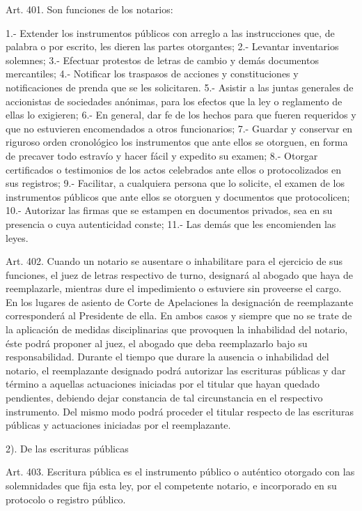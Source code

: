     Art. 401. Son funciones de los notarios:

    1.- Extender los instrumentos públicos con arreglo a las instrucciones que, de palabra o por escrito, les dieren las partes otorgantes;
    2.- Levantar inventarios solemnes;
    3.- Efectuar protestos de letras de cambio y demás documentos mercantiles;
    4.- Notificar los traspasos de acciones y constituciones y notificaciones de prenda que se les solicitaren.
    5.- Asistir a las juntas generales de accionistas de sociedades anónimas, para los efectos que la ley o reglamento de ellas lo exigieren;
    6.- En general, dar fe de los hechos para que fueren requeridos y que no estuvieren encomendados a otros funcionarios;
    7.- Guardar y conservar en riguroso orden cronológico los instrumentos que ante ellos se otorguen, en forma de precaver todo estravío y hacer fácil y expedito su examen;
    8.- Otorgar certificados o testimonios de los actos celebrados ante ellos o protocolizados en sus registros;
    9.- Facilitar, a cualquiera persona que lo solicite, el examen de los instrumentos públicos que ante ellos se otorguen y documentos que protocolicen;
    10.- Autorizar las firmas que se estampen en documentos privados, sea en su presencia o cuya autenticidad conste;
    11.- Las demás que les encomienden las leyes.


    Art. 402. Cuando un notario se ausentare o inhabilitare para el ejercicio de sus funciones, el juez de letras respectivo de turno, designará al abogado que haya de reemplazarle, mientras dure el impedimiento o estuviere sin proveerse el cargo.
    En los lugares de asiento de Corte de Apelaciones la designación de reemplazante corresponderá al Presidente de ella.
    En ambos casos y siempre que no se trate de la aplicación de medidas disciplinarias que provoquen la inhabilidad del notario, éste podrá proponer al juez, el abogado que deba reemplazarlo bajo su responsabilidad.
    Durante el tiempo que durare la ausencia o inhabilidad del notario, el reemplazante designado podrá autorizar las escrituras públicas y dar término a aquellas actuaciones iniciadas por el titular que hayan quedado pendientes, debiendo dejar constancia de tal circunstancia en el respectivo instrumento. Del mismo modo podrá proceder el titular respecto de las escrituras públicas y actuaciones iniciadas por el reemplazante.



    2). De las escrituras públicas


    Art. 403. Escritura pública es el instrumento público o auténtico otorgado con las solemnidades que fija esta ley, por el competente notario, e incorporado en su protocolo o registro público.


